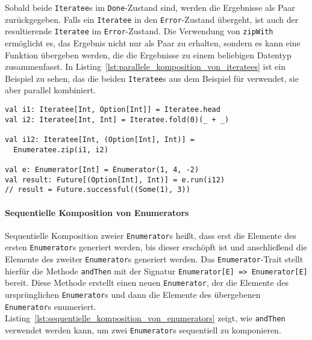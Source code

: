 \documentclass[draft=false
              ,paper=a4
              ,twoside=false
              ,fontsize=11pt
              ,headsepline
              ,BCOR10mm
              ,DIV11
              ]{scrbook}
\begin{document}
Sobald beide \lstinline|Iteratee|s im \lstinline|Done|-Zustand sind, werden die Ergebnisse als Paar zurückgegeben.
Falls ein \lstinline|Iteratee| in den \lstinline|Error|-Zustand übergeht, ist auch der resultierende \lstinline|Iteratee| im \lstinline|Error|-Zustand.
Die Verwendung von \lstinline|zipWith| ermöglicht es, das Ergebnis nicht nur als Paar zu erhalten, sondern es kann eine Funktion übergeben werden, die die Ergebnisse zu einem beliebigen Datentyp zusammenfasst.
In Listing~\ref{lst:parallele_komposition_von_iteratees} ist ein Beispiel zu sehen, das die beiden \lstinline|Iteratee|s aus dem Beispiel für  verwendet, sie aber parallel kombiniert.

\begin{lstlisting}[caption=Parallele Komposition von Iteratees, label=lst:parallele_komposition_von_iteratees]
val i1: Iteratee[Int, Option[Int]] = Iteratee.head
val i2: Iteratee[Int, Int] = Iteratee.fold(0)(_ + _)

val i12: Iteratee[Int, (Option[Int], Int)] =
  Enumeratee.zip(i1, i2)

val e: Enumerator[Int] = Enumerator(1, 4, -2)
val result: Future[(Option[Int], Int)] = e.run(i12)
// result = Future.successful((Some(1), 3))
\end{lstlisting}


\paragraph{Sequentielle Komposition von Enumerators} %
\label{subp:anwendung_sequentielle_komposition_von_enumerators}\mbox{} %

Sequentielle Komposition zweier \lstinline|Enumerator|s heißt, dass erst die Elemente des ersten \lstinline|Enumerator|s generiert werden, bis dieser erschöpft ist und anschließend die Elemente des zweiter \lstinline|Enumerator|s generiert werden.
Das \lstinline|Enumerator|-Trait stellt hierfür die Methode \lstinline|andThen| mit der Signatur \lstinline[breaklines=true]|Enumerator[E] => Enumerator[E]| bereit.
Diese Methode erstellt einen neuen \lstinline|Enumerator|, der die Elemente des ursprünglichen \lstinline|Enumerator|s und dann die Elemente des übergebenen \lstinline|Enumerator|s enumeriert.
Listing~\ref{lst:sequentielle_komposition_von_enumerators} zeigt, wie \lstinline|andThen| verwendet werden kann, um zwei \lstinline|Enumerator|s sequentiell zu komponieren.
\end{document}
